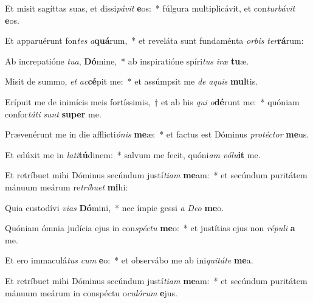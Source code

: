 \item Et misit sagíttas suas, et dissi\textit{pá}\textit{vit} \textbf{e}os:~* fúlgura multiplicávit, et con\textit{tur}\textit{bá}\textit{vit} \textbf{e}os.
\item Et apparuérunt fon\textit{tes} \textit{a}\textbf{quá}rum,~* et reveláta sunt fundaménta \textit{or}\textit{bis} \textit{ter}\textbf{rá}rum:
\item Ab increpatióne \textit{tu}\textit{a}, \textbf{Dó}mine,~* ab inspiratióne spíri\textit{tus} \textit{i}\textit{ræ} \textbf{tu}æ.
\item Misit de summo, \textit{et} \textit{ac}\textbf{cé}pit me:~* et assúmpsit me \textit{de} \textit{a}\textit{quis} \textbf{mul}tis.
\item Erípuit me de inimícis meis fortíssimis,~† et ab his \textit{qui} \textit{o}\textbf{dé}runt me:~* quóniam confor\textit{tá}\textit{ti} \textit{sunt} \textbf{su}\textbf{per} me.
\item Prævenérunt me in die afflicti\textit{ó}\textit{nis} \textbf{me}æ:~* et factus est Dóminus \textit{pro}\textit{téc}\textit{tor} \textbf{me}us.
\item Et edúxit me in \textit{la}\textit{ti}\textbf{tú}dinem:~* salvum me fecit, quóni\textit{am} \textit{vó}\textit{lu}\textbf{it} me.
\item Et retríbuet mihi Dóminus secúndum justí\textit{ti}\textit{am} \textbf{me}am:~* et secúndum puritátem mánuum meárum re\textit{trí}\textit{bu}\textit{et} \textbf{mi}hi:
\item Quia custodívi \textit{vi}\textit{as} \textbf{Dó}mini,~* nec ímpie gessi \textit{a} \textit{De}\textit{o} \textbf{me}o.
\item Quóniam ómnia judícia ejus in con\textit{spéc}\textit{tu} \textbf{me}o:~* et justítias ejus non \textit{ré}\textit{pu}\textit{li} \textbf{a} me.
\item Et ero immaculá\textit{tus} \textit{cum} \textbf{e}o:~* et observábo me ab ini\textit{qui}\textit{tá}\textit{te} \textbf{me}a.
\item Et retríbuet mihi Dóminus secúndum justí\textit{ti}\textit{am} \textbf{me}am:~* et secúndum puritátem mánuum meárum in conspéctu o\textit{cu}\textit{ló}\textit{rum} \textbf{e}jus.
